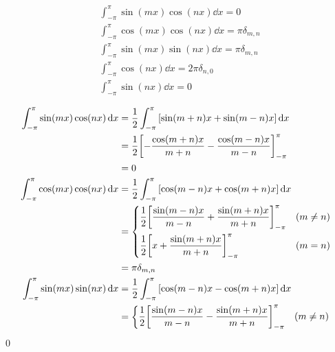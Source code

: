 \documentclass[uplatex,dvipdfmx,a4paper,11pt]{jlreq}
\makeatletter
\theoremstyle{definition}
\renewenvironment{proof}[1][\proofname]{\par
  \normalfont
  \topsep6\p@\@plus6\p@ \trivlist
  \item[\hskip\labelsep{\bfseries #1}\@addpunct{\bfseries}]\ignorespaces\quad\par
}{%
  \qed\endtrivlist\@endpefalse
}
\renewcommand\proofname{証明}
\makeatother
\begin{document}
\begin{proposition}
  \begin{align}
     & \int_{-\pi}^\pi \sin(mx)\cos(nx)\dd{x} = 0               \\
     & \int_{-\pi}^\pi \cos(mx)\cos(nx)\dd{x} = \pi\delta_{m,n} \\
     & \int_{-\pi}^\pi \sin(mx)\sin(nx)\dd{x} = \pi\delta_{m,n} \\
     & \int_{-\pi}^\pi \cos(nx)\dd{x} = 2\pi\delta_{n,0}        \\
     & \int_{-\pi}^\pi \sin(nx)\dd{x} = 0
  \end{align}
\end{proposition}
\begin{proof}
  \begin{align}
    \int_{-\pi}^\pi \sin(mx)\cos(nx)\dd{x} & = \frac{1}{2}\int_{-\pi}^\pi \qty[\sin(m + n)x + \sin(m - n)x]\dd{x}                            \\
                                           & = \frac{1}{2}\qty[- \frac{\cos(m + n)x}{m + n} - \frac{\cos(m - n)x}{m - n}]_{-\pi}^\pi         \\
                                           & = 0                                                                                             \\
    \int_{-\pi}^\pi \cos(mx)\cos(nx)\dd{x} & = \frac{1}{2}\int_{-\pi}^\pi \qty[\cos(m - n)x + \cos(m + n)x]\dd{x}                            \\
                                           & = \begin{dcases}
                                                 \frac{1}{2}\qty[\frac{\sin(m - n)x}{m - n} + \frac{\sin(m + n)x}{m + n}]_{-\pi}^\pi & (m \neq n) \\
                                                 \frac{1}{2}\qty[x + \frac{\sin(m + n)x}{m + n}]_{-\pi}^\pi                          & (m = n)
                                               \end{dcases} \\
                                           & = \pi\delta_{m,n}                                                                               \\
    \int_{-\pi}^\pi \sin(mx)\sin(nx)\dd{x} & = \frac{1}{2}\int_{-\pi}^\pi \qty[\cos(m - n)x - \cos(m + n)x]\dd{x}                            \\
                                           & = \begin{dcases}
                                                 \frac{1}{2}\qty[\frac{\sin(m - n)x}{m - n} - \frac{\sin(m + n)x}{m + n}]_{-\pi}^\pi & (m \neq n) \\

\end{dcases}
\end{align}
\end{proof}
\end{document}
